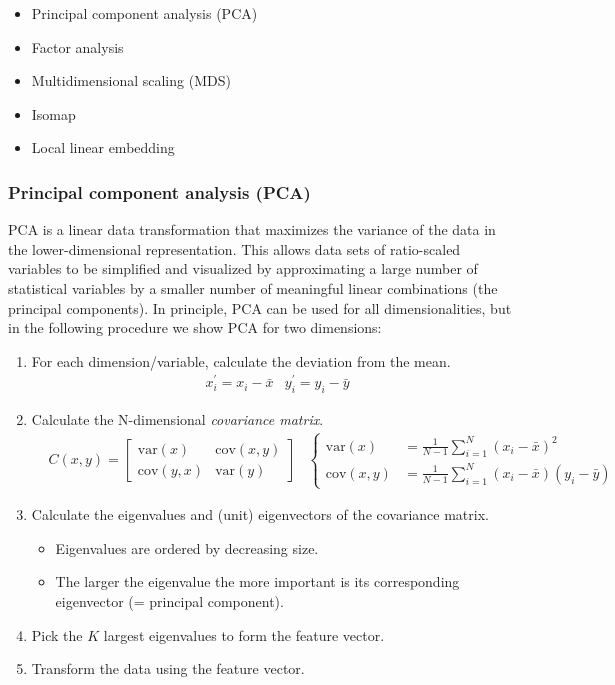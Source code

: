 \begin{itemize}
    \item Principal component analysis (PCA)
    \item Factor analysis
    \item Multidimensional scaling (MDS)
    \item Isomap
    \item Local linear embedding
\end{itemize}

\subsubsection{Principal component analysis (PCA)}

PCA is a linear data transformation that maximizes the variance of the data in the lower-dimensional representation. This allows data sets of ratio-scaled variables to be simplified and visualized by approximating a large number of statistical variables by a smaller number of meaningful linear combinations (the principal components). In principle, PCA can be used for all dimensionalities, but in the following procedure we show PCA for two dimensions:

\begin{enumerate}
    \item For each dimension/variable, calculate the deviation from the mean.
    \begin{align}
        &x_i^\prime=x_i-\bar{x}&y_i^\prime=y_i-\bar{y}
    \end{align}
    \item Calculate the N-dimensional \emph{covariance matrix}.
    \begin{align}
        &C(x,y)=\begin{bmatrix}\mathrm{var}(x) & \mathrm{cov}(x,y)\\\mathrm{cov}(y,x) & \mathrm{var}(y)\end{bmatrix}&\begin{cases}
            \mathrm{var}(x)&\displaystyle=\frac{1}{N-1}\sum_{i=1}^{N}\left(x_i-\bar{x}\right)^2\\
            \mathrm{cov}(x,y)&\displaystyle=\frac{1}{N-1}\sum_{i=1}^{N}\left(x_i-\bar{x}\right)\left(y_i-\bar{y}\right)
        \end{cases}
    \end{align}
    \item Calculate the eigenvalues and (unit) eigenvectors of the covariance matrix.
    \begin{itemize}
        \item Eigenvalues are ordered by decreasing size.
        \item The larger the eigenvalue the more important is its corresponding eigenvector (= principal component).
    \end{itemize}
    \item Pick the $K$ largest eigenvalues to form the feature vector.
    \item Transform the data using the feature vector.
\end{enumerate}

